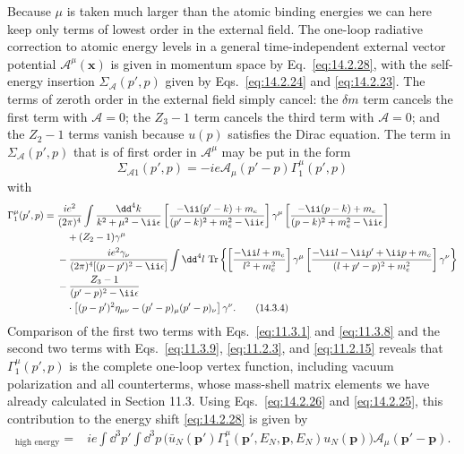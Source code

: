 Because $\mu$ is taken much larger than the atomic binding energies we can
here keep only terms of lowest order in the external field. The one-loop
radiative correction to atomic energy levels in a general time-independent
external vector potential $\mathcal A^\mu(\mathbf x)$ is given in momentum
space by Eq.~\eqref{eq:14.2.28}, with the self-energy insertion
$\Sigma_{\mathcal A}(p',p)$ given by Eqs.~\eqref{eq:14.2.24} and
\eqref{eq:14.2.23}. The terms of zeroth order in the external field simply
cancel: the $\delta m$ term cancels the first term with $\mathcal A=0$; the
$Z_3-1$ term cancels the third term with $\mathcal A=0$; and the $Z_2-1$ terms
vanish because $u(p)$ satisfies the Dirac equation. The term in
$\Sigma_{\mathcal A}(p',p)$ that is of first order in $\mathcal A^\mu$ may be
put in the form
\begin{equation}
\Sigma_{\mathcal A1}(p',p)=-ie\mathcal A_\mu(p'-p)\Gamma_1^\mu(p',p)
\tag{14.3.3}\label{eq:14.3.3}
\end{equation}
with
\begin{align}
\Gamma_1^\mu(p',p)={}&\frac{ie^2}{(2\pi)^4}\int
\frac{\dd^4k}{k^2+\mu^2-\ii\epsilon}
\left[\frac{-\ii(\sl{p}'-\sl{k})+m_e}
{(p'-k)^2+m_e^2-\ii\epsilon}\right]\gamma^\mu
\left[\frac{-\ii(\sl{p}-\sl{k})+m_e}
{(p-k)^2+m_e^2-\ii\epsilon}\right]
\notag\\
&\quad+(Z_2-1)\gamma^\mu \notag\\
&-\frac{ie^2\gamma_\nu}{(2\pi)^4[(p-p')^2-\ii\epsilon]}
\int \dd^4l\,\operatorname{Tr}\left\{
\left[\frac{-\ii\sl{l}+m_e}{l^2+m_e^2}\right]\gamma^\mu
\left[\frac{-\ii\sl{l}-\ii\sl{p}'+\ii\sl{p}+m_e}
{(l+p'-p)^2+m_e^2}\right]\gamma^\nu\right\}
\notag\\
&-\frac{Z_3-1}{(p'-p)^2-\ii\epsilon}\notag\\
&\quad\cdot
\left[(p-p')^2\eta_{\mu\nu}-(p'-p)_\mu(p'-p)_\nu\right]\gamma^\nu.
\tag{14.3.4}\label{eq:14.3.4}
\end{align}
Comparison of the first two terms with Eqs.~\eqref{eq:11.3.1} and
\eqref{eq:11.3.8} and the second two terms with Eqs.~\eqref{eq:11.3.9},
\eqref{eq:11.2.3}, and \eqref{eq:11.2.15} reveals that
$\Gamma_1^\mu(p',p)$ is the complete one-loop vertex function, including
vacuum polarization and all counterterms, whose mass-shell matrix elements we
have already calculated in Section 11.3. Using Eqs.~\eqref{eq:14.2.26} and
\eqref{eq:14.2.25}, this contribution to the energy shift
\eqref{eq:14.2.28} is given by
\begin{align}
[\delta E_N]_{\text{high energy}}
={}&ie\int \dd^3p'\int \dd^3p\,
\bigl(\bar u_N(\mathbf p')\Gamma_1^\mu(\mathbf p',E_N,
\mathbf p,E_N)u_N(\mathbf p)\bigr)
\mathcal A_\mu(\mathbf p'-\mathbf p).
\tag{14.3.5}\label{eq:14.3.5}
\end{align}
